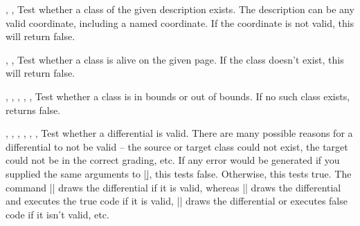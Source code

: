 \begin{sseqdata}[name = basic, cohomological Serre grading]
\begin{commandlist}{
    \IfExistsTF{},
    \IfExistsT{},
    \IfExistsF{}
}%
Test whether a class of the given description exists. The description can be any
valid coordinate, including a named coordinate. If the coordinate is not valid,
this will return false.
\end{commandlist}

\begin{commandlist}{
    \IfAliveTF{},
    \IfAliveT{},
    \IfAliveF{}
}%
Test whether a class is alive on the given page. If the class doesn't exist,
this will return false.
\end{commandlist}

\begin{commandlist}{
    \IfOutOfBoundsTF{},
    \IfOutOfBoundsT{},
    \IfOutOfBoundsF{},
    \IfInBoundsTF{},
    \IfInBoundsT{},
    \IfInBoundsF{}
}%
Test whether a class is in bounds or out of bounds. If no such class exists,
returns false.
\end{commandlist}

\begin{commandlist}{
    \IfValidDifferentialTF{},
    \IfValidDifferentialT{},
    \IfValidDifferentialF{},
    \DrawIfValidDifferentialTF\ooptions{},
    \DrawIfValidDifferentialT\ooptions{},
    \DrawIfValidDifferentialF\ooptions{},
    \DrawIfValidDifferential\ooptions{}
}%
Test whether a differential is valid. There are many possible reasons for a
differential to not be valid -- the source or target class could not exist, the
target could not be in the correct grading, etc. If any error would be generated
if you supplied the same arguments to |\d|, this tests false. Otherwise, this
tests true. The command |\DrawIfValidDifferental| draws the differential if it
is valid, whereas |\DrawIfValidDifferentalT| draws the differential and executes
the true code if it is valid, |\DrawIfValidDifferentalF| draws the differential
or executes false code if it isn't valid, etc.
\end{commandlist}




\end{sseqdata}
